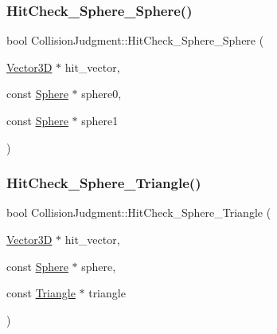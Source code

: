 \mbox{\label{class_collision_judgment_a21e4ce202f713f1b2a7fc593f4daf7d2}} 
\subsubsection{\texorpdfstring{Hit\+Check\+\_\+\+Sphere\+\_\+\+Sphere()}{HitCheck\_Sphere\_Sphere()}}
{\footnotesize\ttfamily bool Collision\+Judgment\+::\+Hit\+Check\+\_\+\+Sphere\+\_\+\+Sphere (\begin{DoxyParamCaption}\item[{\mbox{\hyperlink{class_vector3_d}{Vector3D}} $\ast$}]{hit\+\_\+vector,  }\item[{const \mbox{\hyperlink{class_sphere}{Sphere}} $\ast$}]{sphere0,  }\item[{const \mbox{\hyperlink{class_sphere}{Sphere}} $\ast$}]{sphere1 }\end{DoxyParamCaption})\hspace{0.3cm}{\ttfamily [static]}}

\mbox{\label{class_collision_judgment_a2b4e851cf1fc45dca09175b36fb4f50c}} 
\subsubsection{\texorpdfstring{Hit\+Check\+\_\+\+Sphere\+\_\+\+Triangle()}{HitCheck\_Sphere\_Triangle()}}
{\footnotesize\ttfamily bool Collision\+Judgment\+::\+Hit\+Check\+\_\+\+Sphere\+\_\+\+Triangle (\begin{DoxyParamCaption}\item[{\mbox{\hyperlink{class_vector3_d}{Vector3D}} $\ast$}]{hit\+\_\+vector,  }\item[{const \mbox{\hyperlink{class_sphere}{Sphere}} $\ast$}]{sphere,  }\item[{const \mbox{\hyperlink{class_triangle}{Triangle}} $\ast$}]{triangle }\end{DoxyParamCaption})\hspace{0.3cm}{\ttfamily [static]}}

